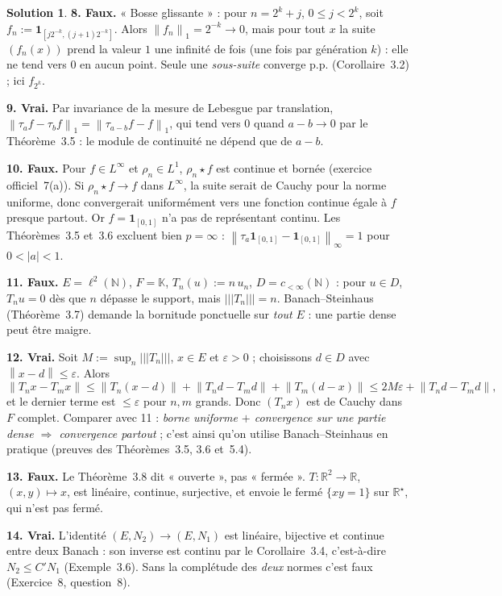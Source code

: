 \documentclass[11pt,a4paper]{article}
\newcommand{\R}{\mathbb{R}}
\newcommand{\N}{\mathbb{N}}
\newcommand{\K}{\mathbb{K}}
\newcommand{\norm}[1]{\left\|#1\right\|}
\newcommand{\opnorm}[1]{|\!|\!|#1|\!|\!|}
\newcommand{\ie}{c'est-à-dire}
\theoremstyle{definition}
\newtheorem*{solution}{Solution}
\begin{document}
\begin{solution}
\medskip
\noindent\textbf{8. Faux.} « Bosse glissante » : pour $n=2^k+j$, $0\le j<2^k$, soit $f_n:=\mathbf 1_{[j2^{-k},(j+1)2^{-k}]}$. Alors $\norm{f_n}_1=2^{-k}\to0$, mais pour tout $x$ la suite $(f_n(x))$ prend la valeur $1$ une infinité de fois (une fois par génération $k$) : elle ne tend vers $0$ en aucun point. Seule une \emph{sous-suite} converge p.p. (Corollaire~3.2) ; ici $f_{2^k}$.

\medskip
\noindent\textbf{9. Vrai.} Par invariance de la mesure de Lebesgue par translation, $\norm{\tau_af-\tau_bf}_1=\norm{\tau_{a-b}f-f}_1$, qui tend vers $0$ quand $a-b\to0$ par le Théorème~3.5 : le module de continuité ne dépend que de $a-b$.

\medskip
\noindent\textbf{10. Faux.} Pour $f\in L^\infty$ et $\rho_n\in L^1$, $\rho_n\star f$ est continue et bornée (exercice officiel~7(a)). Si $\rho_n\star f\to f$ dans $L^\infty$, la suite serait de Cauchy pour la norme uniforme, donc convergerait uniformément vers une fonction continue égale à $f$ presque partout. Or $f=\mathbf 1_{[0,1]}$ n'a pas de représentant continu. Les Théorèmes~3.5 et~3.6 excluent bien $p=\infty$ : $\norm{\tau_a\mathbf 1_{[0,1]}-\mathbf 1_{[0,1]}}_\infty=1$ pour $0<|a|<1$.

\medskip
\noindent\textbf{11. Faux.} $E=\ell^2(\N)$, $F=\K$, $T_n(u):=n\,u_n$, $D=c_{<\infty}(\N)$ : pour $u\in D$, $T_nu=0$ dès que $n$ dépasse le support, mais $\opnorm{T_n}=n$. Banach--Steinhaus (Théorème~3.7) demande la bornitude ponctuelle sur \emph{tout} $E$ : une partie dense peut être maigre.

\medskip
\noindent\textbf{12. Vrai.} Soit $M:=\sup_n\opnorm{T_n}$, $x\in E$ et $\varepsilon>0$ ; choisissons $d\in D$ avec $\norm{x-d}\le\varepsilon$. Alors
\[
\norm{T_nx-T_mx}\le\norm{T_n(x-d)}+\norm{T_nd-T_md}+\norm{T_m(d-x)}\le2M\varepsilon+\norm{T_nd-T_md},
\]
et le dernier terme est $\le\varepsilon$ pour $n,m$ grands. Donc $(T_nx)$ est de Cauchy dans $F$ complet. Comparer avec 11 : \emph{borne uniforme $+$ convergence sur une partie dense $\Rightarrow$ convergence partout} ; c'est ainsi qu'on utilise Banach--Steinhaus en pratique (preuves des Théorèmes~3.5, 3.6 et~5.4).

\medskip
\noindent\textbf{13. Faux.} Le Théorème~3.8 dit « ouverte », pas « fermée ». $T:\R^2\to\R$, $(x,y)\mapsto x$, est linéaire, continue, surjective, et envoie le fermé $\{xy=1\}$ sur $\R^\star$, qui n'est pas fermé.

\medskip
\noindent\textbf{14. Vrai.} L'identité $(E,N_2)\to(E,N_1)$ est linéaire, bijective et continue entre deux Banach : son inverse est continu par le Corollaire~3.4, \ie{} $N_2\le C'N_1$ (Exemple~3.6). Sans la complétude des \emph{deux} normes c'est faux (Exercice~8, question~8).


\end{solution}
\end{document}
